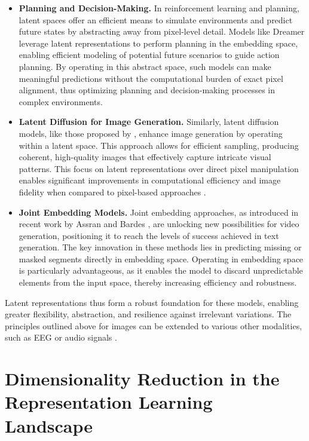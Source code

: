 \begin{itemize}
    \item \textbf{Planning and Decision-Making.} In reinforcement learning and planning, latent spaces offer an efficient means to simulate environments and predict future states by abstracting away from pixel-level detail. Models like Dreamer \citep{hafner2019dream} leverage latent representations to perform planning in the embedding space, enabling efficient modeling of potential future scenarios to guide action planning. By operating in this abstract space, such models can make meaningful predictions without the computational burden of exact pixel alignment, thus optimizing planning and decision-making processes in complex environments.
    
    \item \textbf{Latent Diffusion for Image Generation.} Similarly, latent diffusion models, like those proposed by \cite{rombach2022high}, enhance image generation by operating within a latent space. This approach allows for efficient sampling, producing coherent, high-quality images that effectively capture intricate visual patterns. This focus on latent representations over direct pixel manipulation enables significant improvements in computational efficiency and image fidelity when compared to pixel-based approaches \citep{song2020score}.
    
    \item \textbf{Joint Embedding Models.} Joint embedding approaches, as introduced in recent work by Assran \citep{assran2023self} and Bardes \citep{bardes2023v}, are unlocking new possibilities for video generation, positioning it to reach the levels of success achieved in text generation. The key innovation in these methods lies in predicting missing or masked segments directly in embedding space. Operating in embedding space is particularly advantageous, as it enables the model to discard unpredictable elements from the input space, thereby increasing efficiency and robustness.
\end{itemize}

Latent representations thus form a robust foundation for these models, enabling greater flexibility, abstraction, and resilience against irrelevant variations. The principles outlined above for images can be extended to various other modalities, such as EEG \citep{guetschel2024s} or audio signals \citep{niizumi2021byol}.

\section{Dimensionality Reduction in the Representation Learning Landscape}

